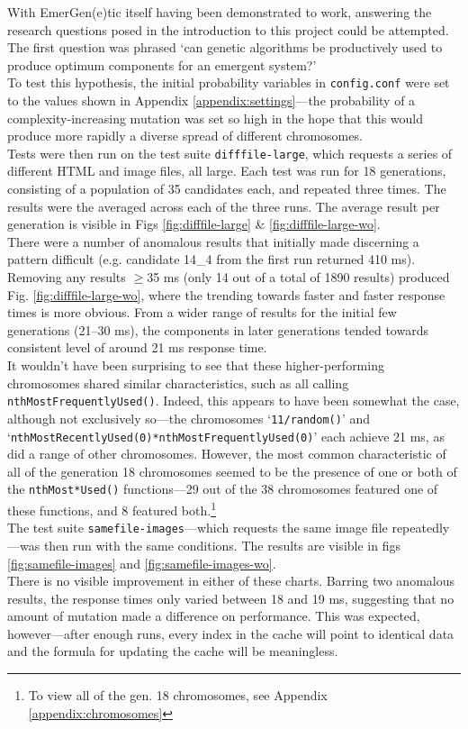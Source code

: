 \documentclass[compsoc,12pt,a4paper]{IEEEtran}
\begin{document}
			With EmerGen(e)tic itself having been demonstrated to work, answering the research questions posed in the introduction to this project could be attempted. The first question was phrased `can genetic algorithms be productively used to produce optimum components for an emergent system?'\\
			To test this hypothesis, the initial probability variables in \lstinline|config.conf| were set to the values shown in Appendix \ref{appendix:settings}---the probability of a complexity-increasing mutation was set so high in the hope that this would produce more rapidly a diverse spread of different chromosomes.\\
			Tests were then run on the test suite \lstinline|difffile-large|, which requests a series of different HTML and image files, all large. Each test was run for 18 generations, consisting of a population of 35 candidates each, and repeated three times. The results were the averaged across each of the three runs. The average result per generation is visible in Figs \ref{fig:difffile-large} \& \ref{fig:difffile-large-wo}.\\
			There were a number of anomalous results that initially made discerning a pattern difficult (e.g. candidate 14\_4 from the first run returned 410 ms). Removing any results $\geq$35 ms (only 14 out of a total of 1890 results) produced Fig. \ref{fig:difffile-large-wo}, where the trending towards faster and faster response times is more obvious. From a wider range of results for the initial few generations (21--30 ms), the components in later generations tended towards consistent level of around 21 ms response time.\\
			It wouldn't have been surprising to see that these higher-performing chromosomes shared similar characteristics, such as all calling \lstinline|nthMostFrequentlyUsed()|. Indeed, this appears to have been somewhat the case, although not exclusively so---the chromosomes `\lstinline|11/random()|' and `\lstinline|nthMostRecentlyUsed(0)*nthMostFrequentlyUsed(0)|' each achieve 21 ms, as did a range of other chromosomes. However, the most common characteristic of all of the generation 18 chromosomes seemed to be the presence of one or both of the \lstinline|nthMost*Used()| functions---29 out of the 38 chromosomes featured one of these functions, and 8 featured both.\footnote{To view all of the gen. 18 chromosomes, see Appendix \ref{appendix:chromosomes}}\\
			The test suite \lstinline|samefile-images|---which requests the same image file repeatedly---was then run with the same conditions. The results are visible in figs \ref{fig:samefile-images} and \ref{fig:samefile-images-wo}.\\
			There is no visible improvement in either of these charts. Barring two anomalous results, the response times only varied between 18 and 19 ms, suggesting that no amount of mutation made a difference on performance. This was expected, however---after enough runs, every index in the cache will point to identical data and the formula for updating the cache will be meaningless.
	
\end{document}
